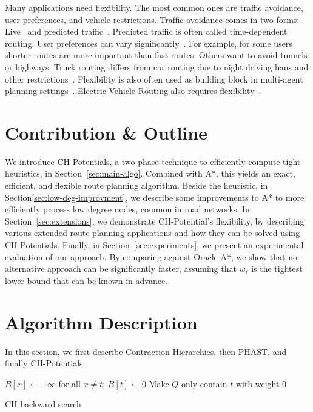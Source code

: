 \documentclass[letterpaper]{article} %
\begin{document}
Many applications need flexibility.
The most common ones are traffic avoidance, user preferences, and vehicle restrictions.
Traffic avoidance comes in two forms: Live~\cite{dgpw-crprn-13,dsw-cch-15} and predicted traffic~\cite{ndls-bastd-12,bgsv-mtdtt-13}.
Predicted traffic is often called time-dependent routing.
%
User preferences can vary significantly~\cite{DBLP:conf/gis/FunkeS15,DBLP:conf/gis/DellingGGKTW15,DBLP:conf/gis/FunkeLS16}.
For example, for some users shorter routes are more important than fast routes.
Others want to avoid tunnels or highways.
%
Truck routing differs from car routing due to night driving bans and other restrictions~\cite{kswz-erptd-20}.
%
Flexibility is also often used as building block in multi-agent planning settings~\cite{DBLP:journals/ai/SharonSFS15,DBLP:journals/tciaig/BaierBHH15}.
%
Electric Vehicle Routing also requires flexibility~\cite{DBLP:journals/algorithmica/BaumDPSWZ20,DBLP:conf/aaai/EisnerFS11}.

\section{Contribution \& Outline}

We introduce CH-Potentials, a two-phase technique to efficiently compute tight heuristics, in Section~\ref{sec:main-algo}.
Combined with A*, this yields an exact, efficient, and flexible route planning algorithm.
Beside the heuristic, in Section\ref{sec:low-deg-improvment}, we describe some improvements to A* to more efficiently process low degree nodes, common in road networks.
In Section~\ref{sec:extensions}, we demonstrate CH-Potential's flexibility, by describing various extended route planning applications and how they can be solved using CH-Potentials.
Finally, in Section~\ref{sec:experiments}, we present an experimental evaluation of our approach.
By comparing against Oracle-A*, we show that no alternative approach can be significantly faster, assuming that $w_\ell$ is the tightest lower bound that can be known in advance.

\section{Algorithm Description}

In this section, we first describe Contraction Hierarchies, then PHAST, and finally CH-Potentials.

\label{sec:main-algo}

\begin{algorithm2e}
$B[x] \leftarrow +\infty$ for all $x\neq t$;
$B[t] \leftarrow 0$\;
Make $Q$ only contain $t$ with weight $0$\;
\caption{CH backward search}
\label{algo:ch-backward}
\end{algorithm2e}
\end{document}
